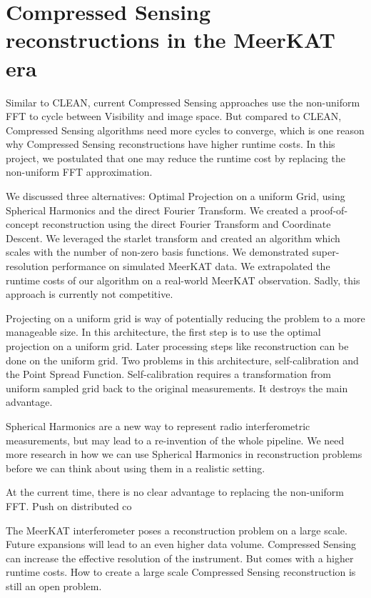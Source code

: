 \section{Compressed Sensing reconstructions in the MeerKAT era}
Similar to CLEAN, current Compressed Sensing approaches use the non-uniform FFT to cycle between Visibility and image space. But compared to CLEAN, Compressed Sensing algorithms need more cycles to converge, which is one reason why Compressed Sensing reconstructions have higher runtime costs. In this project, we postulated that one may reduce the runtime cost by replacing the non-uniform FFT approximation. 

We discussed three alternatives: Optimal Projection on a uniform Grid, using Spherical Harmonics and the direct Fourier Transform. We created a proof-of-concept reconstruction using the direct Fourier Transform and Coordinate Descent. We leveraged the starlet transform and created an algorithm which scales with the number of non-zero basis functions. We demonstrated super-resolution performance on simulated MeerKAT data. We extrapolated the runtime costs of our algorithm on a real-world MeerKAT observation. Sadly, this approach is currently not competitive.

Projecting on a uniform grid is way of potentially reducing the problem to a more manageable size. In this architecture, the first step is to use the optimal projection on a uniform grid. Later processing steps like reconstruction can be done on the uniform grid. Two problems in this architecture, self-calibration and the Point Spread Function. Self-calibration requires a transformation from uniform sampled grid back to the original measurements. It destroys the main advantage.

Spherical Harmonics are a new way to represent radio interferometric measurements, but may lead to a re-invention of the whole pipeline. We need more research in how we can use Spherical Harmonics in reconstruction problems before we can think about using them in a realistic setting.

At the current time, there is no clear advantage to replacing the non-uniform FFT.
Push on distributed co












The MeerKAT interferometer poses a reconstruction problem on a large scale. Future expansions will lead to an even higher data volume. Compressed Sensing can increase the effective resolution of the instrument. But comes with a higher runtime costs. How to create a large scale Compressed Sensing reconstruction is still an open problem.



